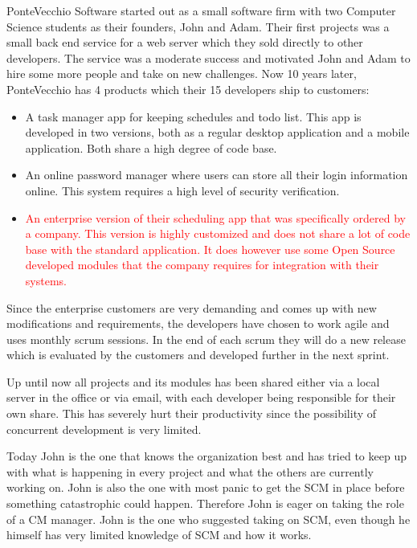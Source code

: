 \documentclass[10pt]{article}
\newcommand\remove[1]{\textcolor{red}{#1}}
\begin{document}
\noindent PonteVecchio Software started out as a small software firm with two Computer Science students as their founders, John and Adam. Their first projects was a small back end service for a web server which they sold directly to other developers. The service was a moderate success and motivated John and Adam to hire some more people and take on new challenges. Now 10 years later, PonteVecchio has 4 products which their 15 developers ship to customers:
\begin{itemize}
\item A task manager app for keeping schedules and todo list. This app is developed in two versions, both as a regular desktop application and a mobile application. Both share a high degree of code base. 
\item An online password manager where users can store all their login information online. This system requires a high level of security verification.
\item \remove{An enterprise version of their scheduling app that was specifically ordered by a company. This version is highly customized and does not share a lot of code base with the standard application. It does however use some Open Source developed modules that the company requires for integration with their systems.}  
\end{itemize}

\noindent Since the enterprise customers are very demanding and comes up with new modifications and requirements, the developers have chosen to work agile and uses monthly scrum sessions. In the end of each scrum they will do a new release which is evaluated by the customers and developed further in the next sprint.

\noindent Up until now all projects and its modules has been shared either via a local server in the office or via email, with each developer being responsible for their own share. This has severely hurt their productivity since the possibility of concurrent development is very limited. 

\noindent Today John is the one that knows the organization best and has tried to keep up with what is happening in every project and what the others are currently working on. John is also the one with most panic to get the SCM in place before something catastrophic could happen. Therefore John is eager on taking the role of a CM manager. John is the one who suggested taking on SCM, even though he himself has very limited knowledge of SCM and how it works.
\end{document}
